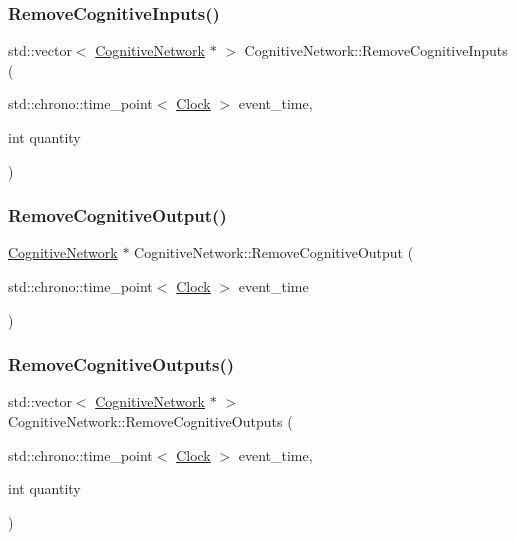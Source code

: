 \subsubsection{\texorpdfstring{Remove\+Cognitive\+Inputs()}{RemoveCognitiveInputs()}}
{\footnotesize\ttfamily std\+::vector$<$ \mbox{\hyperlink{classCognitiveNetwork}{Cognitive\+Network}} $\ast$ $>$ Cognitive\+Network\+::\+Remove\+Cognitive\+Inputs (\begin{DoxyParamCaption}\item[{std\+::chrono\+::time\+\_\+point$<$ \mbox{\hyperlink{universe_8h_a0ef8d951d1ca5ab3cfaf7ab4c7a6fd80}{Clock}} $>$}]{event\+\_\+time,  }\item[{int}]{quantity }\end{DoxyParamCaption})}

\mbox{\label{classCognitiveNetwork_a9874b11ac465c84ccf7baab0a40fb84e}} 
\subsubsection{\texorpdfstring{Remove\+Cognitive\+Output()}{RemoveCognitiveOutput()}}
{\footnotesize\ttfamily \mbox{\hyperlink{classCognitiveNetwork}{Cognitive\+Network}} $\ast$ Cognitive\+Network\+::\+Remove\+Cognitive\+Output (\begin{DoxyParamCaption}\item[{std\+::chrono\+::time\+\_\+point$<$ \mbox{\hyperlink{universe_8h_a0ef8d951d1ca5ab3cfaf7ab4c7a6fd80}{Clock}} $>$}]{event\+\_\+time }\end{DoxyParamCaption})}

\mbox{\label{classCognitiveNetwork_a2f4956b004c828f0165f28c03e089144}} 
\subsubsection{\texorpdfstring{Remove\+Cognitive\+Outputs()}{RemoveCognitiveOutputs()}}
{\footnotesize\ttfamily std\+::vector$<$ \mbox{\hyperlink{classCognitiveNetwork}{Cognitive\+Network}} $\ast$ $>$ Cognitive\+Network\+::\+Remove\+Cognitive\+Outputs (\begin{DoxyParamCaption}\item[{std\+::chrono\+::time\+\_\+point$<$ \mbox{\hyperlink{universe_8h_a0ef8d951d1ca5ab3cfaf7ab4c7a6fd80}{Clock}} $>$}]{event\+\_\+time,  }\item[{int}]{quantity }\end{DoxyParamCaption})}

